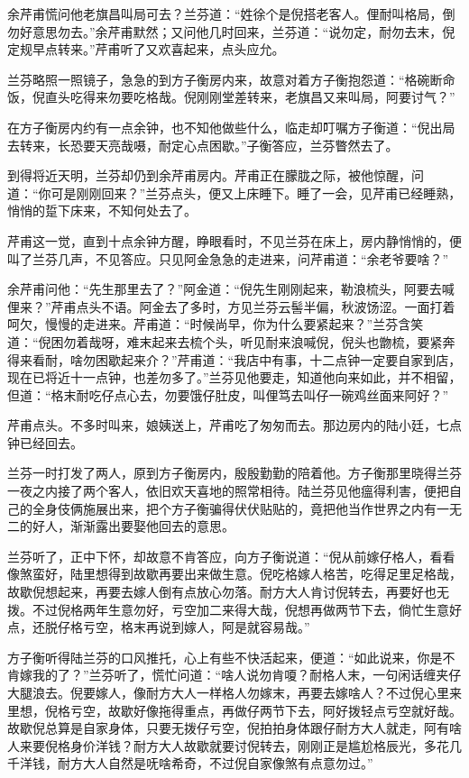 \documentclass[12pt,UTF8]{ctexbook}
\begin{document}
{{{余芹甫慌问他老旗昌叫局可去？兰芬道：“姓徐个是倪搭老客人。俚耐叫格局，倒勿好意思勿去。”余芹甫默然；又问他几时回来，兰芬道：“说勿定，耐勿去末，倪定规早点转来。”芹甫听了又欢喜起来，点头应允。

兰芬略照一照镜子，急急的到方子衡房内来，故意对着方子衡抱怨道：“格碗断命饭，倪直头吃得来勿要吃格哉。倪刚刚堂差转来，老旗昌又来叫局，阿要讨气？”

在方子衡房内约有一点余钟，也不知他做些什么，临走却叮嘱方子衡道：“倪出局去转来，长恐要天亮哉嗫，耐定心点困歇。”子衡答应，兰芬瞥然去了。

到得将近天明，兰芬却仍到余芹甫房内。芹甫正在朦胧之际，被他惊醒，问道：“你可是刚刚回来？”兰芬点头，便又上床睡下。睡了一会，见芹甫已经睡熟，悄悄的踅下床来，不知何处去了。

芹甫这一觉，直到十点余钟方醒，睁眼看时，不见兰芬在床上，房内静悄悄的，便叫了兰芬几声，不见答应。只见阿金急急的走进来，问芹甫道：“余老爷要啥？”

余芹甫问他：“先生那里去了？”阿金道：“倪先生刚刚起来，勒浪梳头，阿要去喊俚来？”芹甫点头不语。阿金去了多时，方见兰芬云髻半偏，秋波饧涩。一面打着呵欠，慢慢的走进来。芹甫道：“时候尚早，你为什么要紧起来？”兰芬含笑道：“倪困勿着哉呀，难末起来去梳个头，听见耐来浪喊倪，倪头也朆梳，要紧奔得来看耐，啥勿困歇起来介？”芹甫道：“我店中有事，十二点钟一定要自家到店，现在已将近十一点钟，也差勿多了。”兰芬见他要走，知道他向来如此，并不相留，但道：“格末耐吃仔点心去，勿要饿仔肚皮，叫俚笃去叫仔一碗鸡丝面来阿好？”

芹甫点头。不多时叫来，娘姨送上，芹甫吃了匆匆而去。那边房内的陆小廷，七点钟已经回去。

兰芬一时打发了两人，原到方子衡房内，殷殷勤勤的陪着他。方子衡那里晓得兰芬一夜之内接了两个客人，依旧欢天喜地的照常相待。陆兰芬见他瘟得利害，便把自己的全身伎俩施展出来，把个方子衡骗得伏伏贴贴的，竟把他当作世界之内有一无二的好人，渐渐露出要娶他回去的意思。

兰芬听了，正中下怀，却故意不肯答应，向方子衡说道：“倪从前嫁仔格人，看看像煞蛮好，陆里想得到故歇再要出来做生意。倪吃格嫁人格苦，吃得足里足格哉，故歇倪想起来，再要去嫁人倒有点放心勿落。耐方大人肯讨倪转去，再要好也无拨。不过倪格两年生意勿好，亏空加二来得大哉，倪想再做两节下去，倘忙生意好点，还脱仔格亏空，格末再说到嫁人，阿是就容易哉。”

方子衡听得陆兰芬的口风推托，心上有些不快活起来，便道：“如此说来，你是不肯嫁我的了？”兰芬听了，慌忙问道：“啥人说勿肯嗄？耐格人末，一句闲话缠夹仔大腿浪去。倪要嫁人，像耐方大人一样格人勿嫁末，再要去嫁啥人？不过倪心里来里想，倪格亏空，故歇好像拖得重点，再做仔两节下去，阿好拨轻点亏空就好哉。故歇倪总算是自家身体，只要无拨仔亏空，倪拍拍身体跟仔耐方大人就走，阿有啥人来要倪格身价洋钱？耐方大人故歇就要讨倪转去，刚刚正是尴尬格辰光，多花几千洋钱，耐方大人自然是呒啥希奇，不过倪自家像煞有点意勿过。”

}}}
\end{document}
